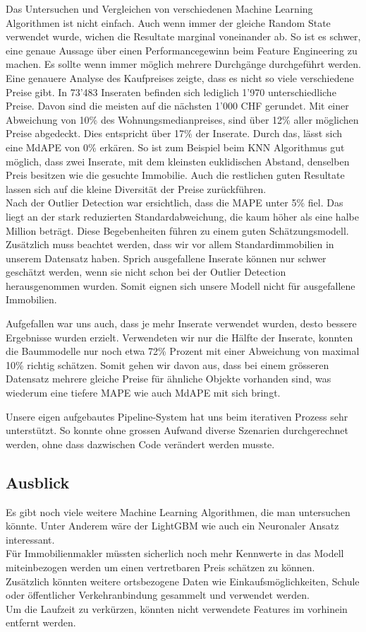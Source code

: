 Das Untersuchen und Vergleichen von verschiedenen Machine Learning Algorithmen ist nicht einfach. Auch wenn immer der gleiche Random State verwendet wurde, wichen die Resultate marginal voneinander ab. So ist es schwer, eine genaue Aussage über einen Performancegewinn beim Feature Engineering zu machen. Es sollte wenn immer möglich mehrere Durchgänge durchgeführt werden.\\
Eine genauere Analyse des Kaufpreises zeigte, dass es nicht so viele verschiedene Preise gibt. In 73'483 Inseraten befinden sich lediglich 1'970 unterschiedliche Preise. Davon sind die meisten auf die nächsten 1'000 CHF gerundet. Mit einer Abweichung von 10\% des Wohnungsmedianpreises, sind über 12\% aller möglichen Preise abgedeckt. Dies entspricht über 17\% der Inserate. Durch das, lässt sich eine MdAPE von 0\% erkären. So ist zum Beispiel beim KNN Algorithmus gut möglich, dass zwei Inserate, mit dem kleinsten euklidischen Abstand, denselben Preis besitzen wie die gesuchte Immobilie. Auch die restlichen guten Resultate lassen sich auf die kleine Diversität der Preise zurückführen.\\
Nach der Outlier Detection war ersichtlich, dass die MAPE unter 5\% fiel. Das liegt an der stark reduzierten Standardabweichung, die kaum höher als eine halbe Million beträgt. Diese Begebenheiten führen zu einem guten Schätzungsmodell.\\
Zusätzlich muss beachtet werden, dass wir vor allem Standardimmobilien in unserem Datensatz haben. Sprich ausgefallene Inserate können nur schwer geschätzt werden, wenn sie nicht schon bei der Outlier Detection herausgenommen wurden. Somit eignen sich unsere Modell nicht für ausgefallene Immobilien.

Aufgefallen war uns auch, dass je mehr Inserate verwendet wurden, desto bessere Ergebnisse wurden erzielt. Verwendeten wir nur die Hälfte der Inserate, konnten die Baummodelle nur noch etwa 72\% Prozent mit einer Abweichung von maximal 10\% richtig schätzen. Somit gehen wir davon aus, dass bei einem grösseren Datensatz mehrere gleiche Preise für ähnliche Objekte vorhanden sind, was wiederum eine tiefere MAPE wie auch MdAPE mit sich bringt.

Unsere eigen aufgebautes Pipeline-System hat uns beim iterativen Prozess sehr unterstützt. So konnte ohne grossen Aufwand diverse Szenarien durchgerechnet werden, ohne dass dazwischen Code verändert werden musste.
%	
\subsection{Ausblick} 
Es gibt noch viele weitere Machine Learning Algorithmen, die man untersuchen könnte. Unter Anderem wäre der LightGBM wie auch ein Neuronaler Ansatz interessant.\\ 
Für Immobilienmakler müssten sicherlich noch mehr Kennwerte in das Modell miteinbezogen werden um einen vertretbaren Preis schätzen zu können. Zusätzlich könnten weitere ortsbezogene Daten wie Einkaufsmöglichkeiten, Schule oder öffentlicher Verkehranbindung gesammelt und verwendet werden.\\
Um die Laufzeit zu verkürzen, könnten nicht verwendete Features im vorhinein entfernt werden.

